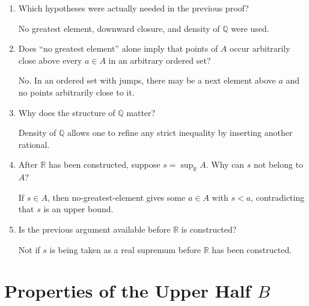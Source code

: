 \documentclass{self-check}
\begin{document}
\begin{enumerate}[label=\arabic{*}., itemsep=10pt]
    \begin{answer}
      Choose \(z\in A\) with \(a<z\). By density choose rational
      \[ a<a'<\min(z,a+\varepsilon). \]
      Since \(a'<z\) and \(A\) is downward closed, \(a'\in A\).
    \end{answer}
  \item Which hypotheses were actually needed in the previous proof?

    \begin{answer}
      No greatest element, downward closure, and density of \(\mathbb{Q}\) were used.
    \end{answer}
  \item Does ``no greatest element'' alone imply that points of \(A\) occur arbitrarily close above every \(a\in A\) in an arbitrary ordered set?

    \begin{answer}
      No. In an ordered set with jumps, there may be a next element above \(a\) and no points arbitrarily close to it.
    \end{answer}
  \item Why does the structure of \(\mathbb{Q}\) matter?

    \begin{answer}
      Density of \(\mathbb{Q}\) allows one to refine any strict inequality by inserting another rational.
    \end{answer}
  \item After \(\mathbb{R}\) has been constructed, suppose \(s=\sup_{\mathbb{R}}A\). Why can \(s\) not belong to \(A\)?

    \begin{answer}
      If \(s\in A\), then no-greatest-element gives some \(a\in A\) with \(s<a\), contradicting that \(s\) is an upper bound.
    \end{answer}
  \item Is the previous argument available before \(\mathbb{R}\) is constructed?

    \begin{answer}
      Not if \(s\) is being taken as a real supremum before \(\mathbb{R}\) has been constructed.
    \end{answer}
\end{enumerate}

\section{Properties of the Upper Half \texorpdfstring{\(B\)}{B}}
\end{document}
